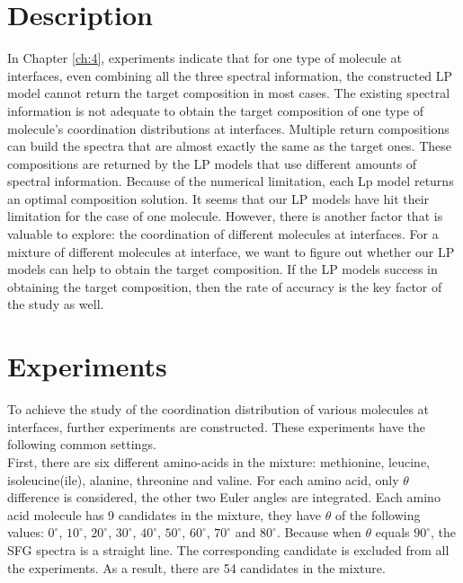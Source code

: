  \label{ch:5}
\section{Description}

In Chapter \ref{ch:4}, experiments indicate that for one type of molecule at interfaces, even combining all the three spectral information, the constructed LP model cannot return the target composition in most cases. The existing spectral information is not adequate to obtain the target composition of one type of molecule's coordination distributions at interfaces. Multiple return compositions can build the spectra that are almost exactly the same as the target ones. These compositions are returned by the LP models that use different amounts of spectral information. Because of the numerical limitation, each Lp model returns an optimal composition solution. It seems that our LP models have hit their limitation for the case of one molecule. However, there is another factor that is valuable to explore: the coordination of different molecules at interfaces. For a mixture of different molecules at interface, we want to figure out whether our LP models can help to obtain the target composition. If the LP models success in obtaining the target composition, then the rate of accuracy is the key factor of the study as well. \\

\section{Experiments}
To achieve the study of the coordination distribution of various molecules at interfaces, further experiments are constructed. These experiments have the following common settings. \\

First, there are six different amino-acids in the mixture: methionine, leucine, isoleucine(ile), alanine, threonine and valine. For each amino acid, only $\theta$ difference is considered, the other two Euler angles are integrated. Each amino acid molecule has 9 candidates in the mixture, they have $\theta$ of the following values: $0^{\circ}$,  $10^{\circ}$, $20^{\circ}$, $30^{\circ}$, $40^{\circ}$, $50^{\circ}$, $60^{\circ}$, $70^{\circ}$ and $80^{\circ}$. Because when $\theta$ equals $90^{\circ}$, the SFG spectra is a straight line. The corresponding candidate is excluded from all the experiments. As a result, there are 54 candidates in the mixture. \\

